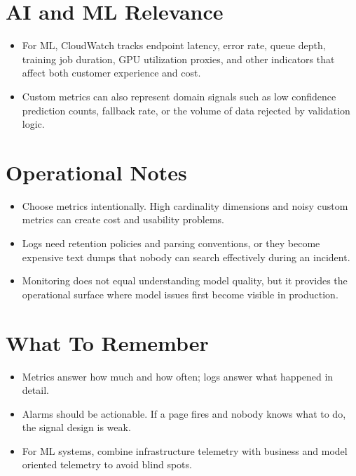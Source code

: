 \documentclass[10pt,twocolumn]{article}
\begin{document}
\section*{AI and ML Relevance}
\begin{itemize}
\item For ML, CloudWatch tracks endpoint latency, error rate, queue depth, training job duration, GPU utilization proxies, and other indicators that affect both customer experience and cost.
\item Custom metrics can also represent domain signals such as low confidence prediction counts, fallback rate, or the volume of data rejected by validation logic.
\end{itemize}

\section*{Operational Notes}
\begin{itemize}
\item Choose metrics intentionally. High cardinality dimensions and noisy custom metrics can create cost and usability problems.
\item Logs need retention policies and parsing conventions, or they become expensive text dumps that nobody can search effectively during an incident.
\item Monitoring does not equal understanding model quality, but it provides the operational surface where model issues first become visible in production.
\end{itemize}

\section*{What To Remember}
\begin{itemize}
\item Metrics answer how much and how often; logs answer what happened in detail.
\item Alarms should be actionable. If a page fires and nobody knows what to do, the signal design is weak.
\item For ML systems, combine infrastructure telemetry with business and model oriented telemetry to avoid blind spots.
\end{itemize}
\end{document}
